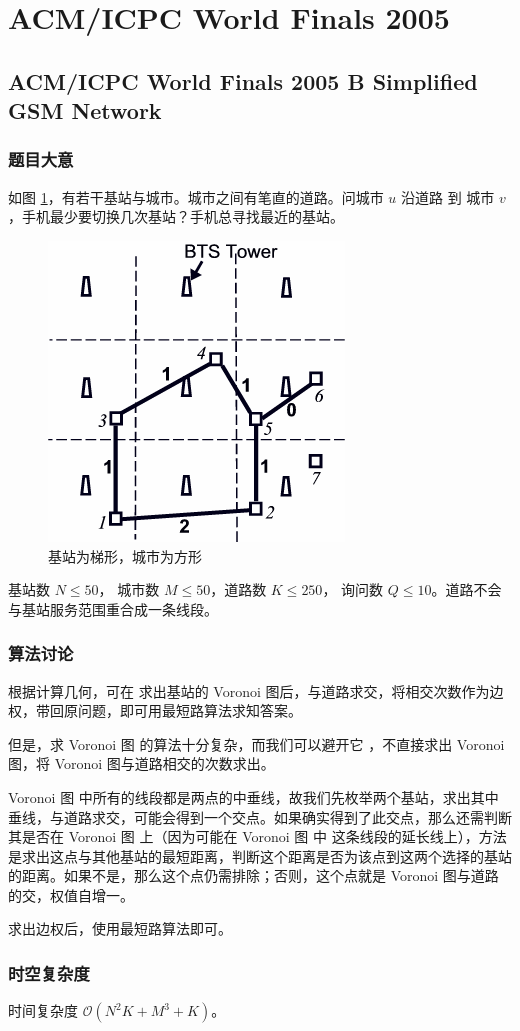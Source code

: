 
	\section{ACM/ICPC World Finals 2005}
		\subsection{ACM/ICPC World Finals 2005 B Simplified GSM Network}
			\subsubsection{题目大意}
				如图 \ref{2005b}，有若干基站与城市。城市之间有笔直的道路。问城市 $u$ 沿道路 到 城市 $v$，手机最少要切换几次基站？手机总寻找最近的基站。
				\begin{figure}[htb]
					\centering
					\includegraphics[width=0.3 \textwidth]{2005b.png}
					\caption{基站为梯形，城市为方形} \label{2005b}
				\end{figure}

				基站数 $N \le 50$， 城市数  $M \le 50$，道路数 $K \le 250$， 询问数  $Q \le 10$。道路不会与基站服务范围重合成一条线段。
			\subsubsection{算法讨论}
				根据计算几何，可在
				求出基站的 Voronoi 图后，与道路求交，将相交次数作为边权，带回原问题，即可用最短路算法求知答案。
				
				但是，求  Voronoi 图 的算法十分复杂，而我们可以避开它 ，不直接求出 Voronoi 图，将  Voronoi 图与道路相交的次数求出。
				
				 Voronoi 图 中所有的线段都是两点的中垂线，故我们先枚举两个基站，求出其中垂线，与道路求交，可能会得到一个交点。如果确实得到了此交点，那么还需判断其是否在 Voronoi 图 上（因为可能在 Voronoi 图 中 这条线段的延长线上），方法是求出这点与其他基站的最短距离，判断这个距离是否为该点到这两个选择的基站的距离。如果不是，那么这个点仍需排除；否则，这个点就是 Voronoi 图与道路的交，权值自增一。
				
				求出边权后，使用最短路算法即可。
			\subsubsection{时空复杂度}
				时间复杂度 $\mathcal{O}\left(N^2K + M^3 + K\right)$。
					
